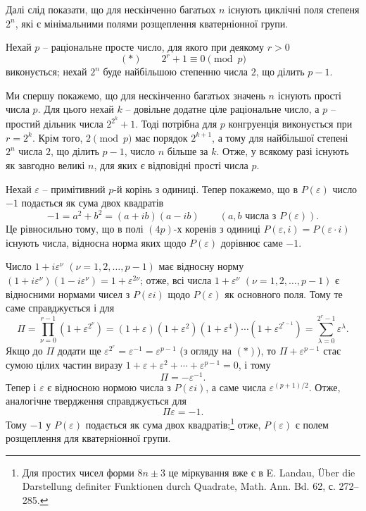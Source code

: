 \documentclass[11pt]{article}
\begin{document}
\noindent Далі слід показати, що для нескінченно багатьох $n$ існують циклічні поля степеня $2^n$, які є мінімальними полями розщеплення кватерніонної групи.

\medskip

\noindent Нехай $p$ -- раціональне просте число, для якого при деякому $r>0$
\[
        (*)\qquad 2^r+1\equiv0\pmod p
\]
виконується; нехай $2^n$ буде найбільшою степенню числа $2$, що ділить $p-1$.

Ми спершу покажемо, що для нескінченно багатьох значень $n$ існують прості числа $p$. Для цього нехай $k$ -- довільне додатне ціле раціональне число, а $p$ -- простий дільник числа $2^{2^k}+1$. Тоді потрібна для $p$ конгруенція виконується при $r=2^k$. Крім того, $2\pmod p$ має порядок $2^{k+1}$, а тому для найбільшої степені $2^n$ числа $2$, що ділить $p-1$, число $n$ більше за $k$. Отже, у всякому разі існують як завгодно великі $n$, для яких є відповідні прості числа $p$.

Нехай $\varepsilon$ -- примітивний $p$-й корінь з одиниці. Тепер покажемо, що в $P(\varepsilon)$ число $-1$ подається як сума двох квадратів
\[
        -1=a^2+b^2=(a+ib)(a-ib)\qquad (a,b\text{ числа з }P(\varepsilon)).
\]
Це рівносильно тому, що в полі $(4p)$-х коренів з одиниці $P(\varepsilon,i)=P(\varepsilon\cdot i)$ існують числа, відносна норма яких щодо $P(\varepsilon)$ дорівнює саме $-1$.

Число $1+i\varepsilon^\nu$ $(\nu=1,2,\ldots,p-1)$ має відносну норму $(1+i\varepsilon^\nu)(1-i\varepsilon^\nu)=1+\varepsilon^{2\nu}$; отже, всі числа $1+\varepsilon^\nu$ $(\nu=1,2,\ldots,p-1)$ є відносними нормами чисел з $P(\varepsilon i)$ щодо $P(\varepsilon)$ як основного поля. Тому те саме справджується і для
\[
\Pi=\prod_{\nu=0}^{r-1}(1+\varepsilon^{2^\nu})
=(1+\varepsilon)(1+\varepsilon^2)(1+\varepsilon^4)\cdots(1+\varepsilon^{2^{r-1}})
=\sum_{\lambda=0}^{2^r-1}\varepsilon^\lambda.
\]
Якщо до $\Pi$ додати ще $\varepsilon^{2^r}=\varepsilon^{-1}=\varepsilon^{p-1}$ (з огляду на $(*)$), то $\Pi+\varepsilon^{p-1}$ стає сумою цілих частин виразу $1+\varepsilon+\varepsilon^2+\cdots+\varepsilon^{p-1}=0$, і тому
\[
        \Pi=-\varepsilon^{-1}.
\]
Тепер і $\varepsilon$ є відносною нормою числа з $P(\varepsilon i)$, а саме числа $\varepsilon^{(p+1)/2}$. Отже, аналогічне твердження справджується для
\[
        \Pi\varepsilon=-1.
\]
Тому $-1$ у $P(\varepsilon)$ подається як сума двох квадратів;\footnote{Для простих чисел форми $8n\pm3$ це міркування вже є в E. Landau, Über die Darstellung definiter Funktionen durch Quadrate, Math. Ann. Bd. 62, с. 272--285.} отже, $P(\varepsilon)$ є полем розщеплення для кватерніонної групи.
\end{document}
